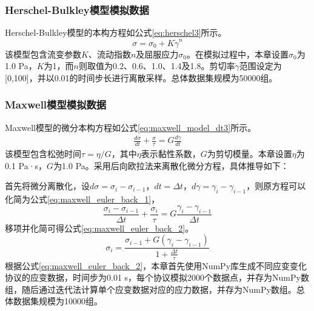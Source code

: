 \subsubsection{Herschel-Bulkley模型模拟数据}
Herschel-Bulkley模型的本构方程如公式\eqref{eq:herschel3}所示。
\begin{equation}
  \sigma=\sigma_0+K\dot{\gamma}^n \label{eq:herschel3}
\end{equation}
该模型包含流变参数$K$、流动指数$n$及屈服应力$\sigma_0$。在模拟过程中，本章设置$\sigma_0$为1.0 Pa，$K$为1，而$n$则取值为0.2、0.6、1.0、1.4及1.8。剪切率$\dot{\gamma}$范围设定为[0,100]，并以0.01的时间步长进行离散采样。总体数据集规模为50000组。

\subsubsection{Maxwell模型模拟数据}
Maxwell模型的微分本构方程如公式\eqref{eq:maxwell_model_dt3}所示。
\begin{gather}
  \frac{d\sigma}{dt} + \frac{\sigma}{\tau}  = G \frac{d\gamma}{dt} \label{eq:maxwell_model_dt3}
\end{gather}
该模型包含松弛时间$\tau=\eta/G$，其中$\eta$表示黏性系数，$G$为剪切模量。本章设置$\eta$为0.1 Pa·s，$G$为1.0 Pa。采用后向欧拉法来离散化微分方程，具体推导如下：

首先将微分离散化，设$d\sigma=\sigma_i - \sigma_{i-1}$，$dt=\Delta t$，$d\gamma=\gamma_i - \gamma_{i-1}$，则原方程可以化简为公式\eqref{eq:maxwell_euler_back_1}，
\begin{equation}
  \frac{\sigma_i - \sigma_{i-1}}{\Delta t} + \frac{\sigma_i}{\tau} = G \frac{\gamma_i - \gamma_{i-1}}{\Delta t} \label{eq:maxwell_euler_back_1}
\end{equation}
移项并化简可得公式\eqref{eq:maxwell_euler_back_2}。
\begin{equation}
  \sigma_i = \frac{\sigma_{i-1} + G (\gamma_i - \gamma_{i-1})}{1 + \frac{\Delta t}{\tau}} \label{eq:maxwell_euler_back_2}
\end{equation}
根据公式\eqref{eq:maxwell_euler_back_2}，本章首先使用NumPy库生成不同应变变化协议的应变数据，时间步为0.01 s，每个协议模拟2000个数据点，并存为NumPy数组，随后通过迭代法计算单个应变数据对应的应力数据，并存为NumPy数组。总体数据集规模为10000组。

